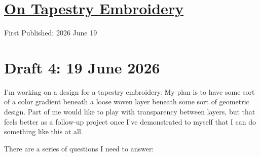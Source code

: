 \documentclass[12pt]{article}
\renewcommand{\,}{\textsuperscript{,}}
\begin{document}
  
\doublespacing  
\section{\href{tapestery-embroidery.html}{On Tapestry Embroidery}}  
First Published: 2026 June 19

\section{Draft 4: 19 June 2026}

I'm working on a design for a tapestry embroidery.  
My plan is to have some sort of a color gradient beneath a loose woven layer beneath some sort of geometric design.  
Part of me would like to play with transparency between layers, but that feels better as a follow-up project once I've demonstrated to myself that I can do something like this at all.

There are a series of questions I need to answer:
\end{document}
